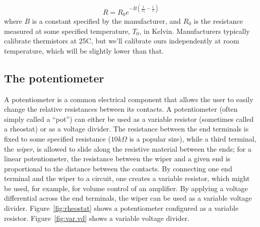 \documentclass[11pt]{article} %
\begin{document}
\begin{equation}
R = R_0 e^{-B\left(\frac 1 {T_0} - \frac 1 T \right)}
\label{eq:thermistor}
\end{equation}
%
where $B$ is a constant specified by the manufacturer, and $R_0$ is the resistance measured at some specified temperature, $T_0$, in Kelvin. Manufacturers typically calibrate thermistors at 25C, but we’ll calibrate ours independently at room temperature, which will be slightly lower than that.

\subsection{The potentiometer}

A potentiometer is a common electrical component that allows the user to easily change the relative resistances between its contacts. A potentiometer (often simply called a “pot”) can either be used as a variable resistor (sometimes called a rheostat) or as a voltage divider. The resistance between the end terminals is fixed to some specified resistance ($10k\Omega$ is a popular size), while a third terminal, the \emph{wiper}, is allowed to slide along the resistive material between the ends; for a linear potentiometer, the resistance between the wiper and a given end is proportional to the distance between the contacts. By connecting one end terminal and the wiper to a circuit, one creates a variable resistor, which might be used, for example, for volume control of an amplifier. By applying a voltage differential across the end terminals, the wiper can be used as a variable voltage divider. Figure~\ref{fig:rheostat} shows a potentiometer configured as a variable resistor. Figure~\ref{fig:var.vd} shows a variable voltage divider.
\end{document}
